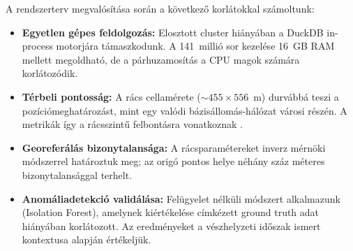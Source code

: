 A rendszerterv megvalósítása során a következő korlátokkal számoltunk:
\begin{itemize}
    \item \textbf{Egyetlen gépes feldolgozás:} Elosztott cluster hiányában a DuckDB in-process motorjára támaszkodunk. A 141~millió sor kezelése 16~GB RAM mellett megoldható, de a párhuzamosítás a CPU magok számára korlátozódik.
    \item \textbf{Térbeli pontosság:} A rács cellamérete (${\sim}455 \times 556$~m) durvábbá teszi a pozíciómeghatározást, mint egy valódi bázisállomás-hálózat városi részén. A metrikák így a rácsszintű felbontásra vonatkoznak \cite{gonzalez2008understanding}.
    \item \textbf{Georeferálás bizonytalansága:} A rácsparamétereket inverz mérnöki módszerrel határoztuk meg; az origó pontos helye néhány száz méteres bizonytalansággal terhelt.
    \item \textbf{Anomáliadetekció validálása:} Felügyelet nélküli módszert alkalmazunk (Isolation Forest), amelynek kiértékelése címkézett ground truth adat hiányában korlátozott. Az eredményeket a vészhelyzeti időszak ismert kontextusa alapján értékeljük.
\end{itemize}
